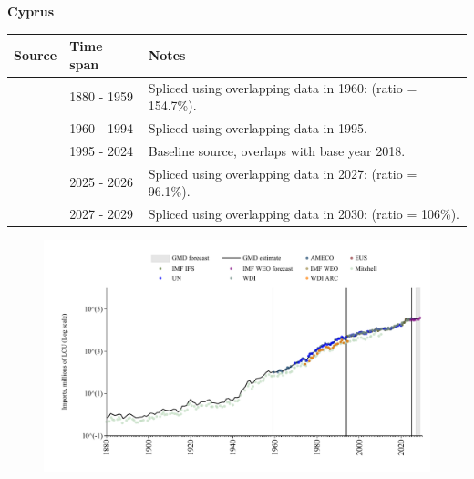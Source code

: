 \documentclass[12pt,a4paper,landscape]{article}
\begin{document}
\begin{adjustbox}{max totalsize={\paperwidth}{\paperheight},center}
\begin{minipage}[t][\textheight][t]{\textwidth}
\vspace*{0.5cm}
{}
\begin{center}
{\Large\bfseries Cyprus}
\end{center}
\vspace{0.5cm}
\begin{table}[H]
\centering
\small
\begin{tabular}{|l|l|l|}
\hline
\textbf{Source} & \textbf{Time span} & \textbf{Notes} \\
\hline
\rowcolor{white}\cite{Mitchell}& 1880 - 1959 &Spliced using overlapping data in 1960: (ratio = 154.7\%).\\
\rowcolor{lightgray}\cite{AMECO}& 1960 - 1994 &Spliced using overlapping data in 1995.\\
\rowcolor{white}\cite{EUS}& 1995 - 2024 &Baseline source, overlaps with base year 2018.\\
\rowcolor{lightgray}\cite{AMECO}& 2025 - 2026 &Spliced using overlapping data in 2027: (ratio = 96.1\%).\\
\rowcolor{white}\cite{IMF_WEO_forecast}& 2027 - 2029 &Spliced using overlapping data in 2030: (ratio = 106\%).\\
\hline
\end{tabular}
\end{table}
\begin{figure}[H]
\centering
\includegraphics[width=\textwidth,height=0.6\textheight,keepaspectratio]{graphs/CYP_imports.pdf}
\end{figure}
\end{minipage}
\end{adjustbox}
\end{document}

